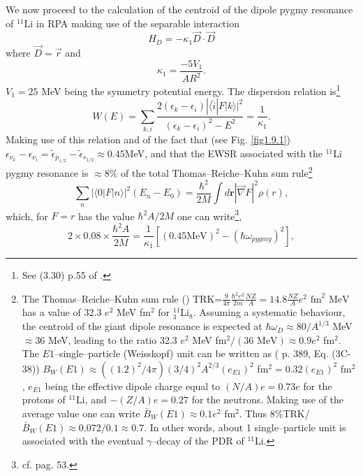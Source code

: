 We now proceed to the calculation of the centroid of the dipole pygmy resonance of $^{11}$Li in  RPA making use of the separable interaction
 \begin{equation}\label{eq2.F.6}
H_D=-\kappa_1\vec D\cdot\vec D
 \end{equation}
where $\vec D=\vec r$ and
 \begin{equation}
\kappa_1=\frac{-5V_1}{AR^2}.
 \end{equation}
  $V_1=25$ MeV being the symmetry potential energy.
The  dispersion relation is\footnote{See (3.30) p.55 of \cite{Bortignon:98}.}
\begin{equation}
W(E)=\sum_{k,i}\frac{2(\epsilon_k-\epsilon_i)|\langle \tilde i|F|k\rangle|^2}{(\epsilon_k-\epsilon_i)^2-E^2}=\frac{1}{\kappa_1}.
\end{equation}
 Making use of this relation and of the fact that (see Fig. \ref{fig1.9.1}) 
 $\epsilon_{\nu_k}-\epsilon_{\nu_i}=\tilde\epsilon_{p_{1/2}}-\tilde\epsilon_{s_{1/2}}\approx 0.45 $MeV, and that the EWSR associated with the $^{11}$Li pygmy resonance is $\approx 8$\% of the total Thomas--Reiche--Kuhn sum rule\footnote{The Thomas--Reiche--Kuhn sum rule (\cite{Bohr:75,Bortignon:98}) TRK=$\frac{9}{4\pi} \frac{\hbar^2e^2}{2m} \frac{NZ}{A}=14.8 \frac{NZ}{A} e^2\text{ fm}^2 \text{ MeV}$ has a value of 32.3 $e^2$ MeV fm$^2$ for $^{11}_3$Li$_8$. Assuming a systematic behaviour, the centroid of the giant dipole resonance is expected at $\hbar\omega_D\approx80/A^{1/3}$ MeV $\approx 36$ MeV, leading to the ratio 32.3 $e^2$ MeV fm$^2/(36\text{ MeV})\approx 0.9 e^2$ fm$^2$. The $E1$--single--particle (Weisskopf) unit can be written as (\cite{Bohr:69} p. 389, Eq. (3C-38)) $B_W(E1)\approx ((1.2)^2/4\pi) (3/4)^2 A^{2/3} (e_{E1})^2$ fm$^2=0.32 (e_{E1})^2$ fm$^2$, $e_{E1}$ being the effective dipole charge equal to $(N/A)e=0.73 e$ for the protons of $^{11}$Li, and $-(Z/A)e=0.27$ for the neutrons. Making use of the average value one can write $\bar B_W(E1)\approx0.1 e^2$ fm$^2$. Thus 8\%TRK/$\bar B_W(E1)\approx 0.072/0.1\approx 0.7$. In other words, about 1 single--particle unit is associated with the eventual $\gamma$--decay of the PDR of $^{11}$Li.}
 \begin{equation}
\sum_n |\langle0|F|n\rangle|^2(E_n-E_0)=\frac{\hbar^2}{2M}\int d\mathbf r |\vec\nabla F|^2 \rho(r),
 \end{equation}
 which, for $F=r$ has the value $\hbar^2 A/2M$ one can write\footnote{cf. \cite{Bertsch:05} pag. 53.}, 
\begin{equation}
2\times 0.08\times \frac{\hbar^2A}{2M}=\frac{1}{\kappa_1}[(0.45\text{MeV})^2-(\hbar \omega_{pygmy})^2],
\end{equation}

